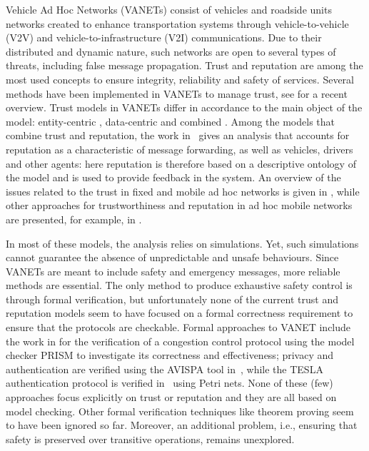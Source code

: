 \documentclass[compsoc, conference, letterpaper, 10pt, times]{IEEEtran}
\begin{document}
Vehicle Ad Hoc Networks (VANETs) consist of vehicles and roadside units networks created to enhance transportation systems through vehicle-to-vehicle (V2V) and vehicle-to-infrastructure (V2I) communications. Due to their distributed and dynamic nature, such networks are open to several types of threats, including false message propagation. Trust and reputation are among the  most used concepts to ensure integrity, reliability and safety of services. Several methods have been implemented in VANETs to manage trust, see \cite{Soleymani2015} for a recent overview. Trust models in VANETs differ in accordance to the main object of the model: entity-centric \cite{5641621, GomezMarmol:2012:TTR:2160992.2161100}, data-centric \cite{conf/infocom/RayaPGH08, Lo2009} and combined \cite{Wei2012}. Among the models that combine trust and reputation, the work in~\cite{glenford} gives an analysis that accounts for reputation as a characteristic of message forwarding, as well as vehicles, drivers and other agents: here reputation is therefore based on a descriptive ontology of the model and is used to provide feedback in the system. An overview of the issues related to the trust in fixed and mobile ad hoc networks is given in \cite{DBLP:conf/vtc/WexBHLD08}, while other approaches for trustworthiness and reputation in ad hoc mobile networks are presented, for example, in \cite{DBLP:conf/um/FinnsonZTMC12, DBLP:journals/ijaisc/ChaurasiaTV15}.

In most of these models, the analysis relies on simulations. Yet, such
simulations cannot guarantee the absence of unpredictable and unsafe
behaviours. Since VANETs are meant to include safety and emergency messages,
more reliable methods are essential. The only method to produce exhaustive
safety control is through formal verification, but unfortunately none of the
current trust and reputation models seem to have focused on a formal
correctness requirement to ensure that the protocols are checkable. Formal
approaches to VANET include the work in \cite{DBLP:conf/vtc/KonurF11} for
the verification of a congestion control protocol using the model checker PRISM to investigate its correctness and effectiveness; privacy and authentication are verified using the AVISPA tool in~\cite{bouassida2011authentication}, while the TESLA authentication protocol is verified in~\cite{tesla-cpn} using Petri nets.  None of these (few) approaches focus explicitly on trust or reputation and they are all based on model checking. Other formal verification techniques like theorem proving seem to have been ignored so far. Moreover, an additional problem, i.e., ensuring that safety is preserved over transitive operations, remains unexplored.
\end{document}
